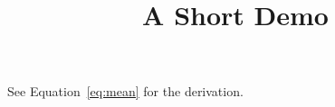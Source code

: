 \documentclass[article]{jss}
\title{A Short Demo}
\begin{document}
See Equation~\ref{eq:mean} for the derivation.
\end{document}
